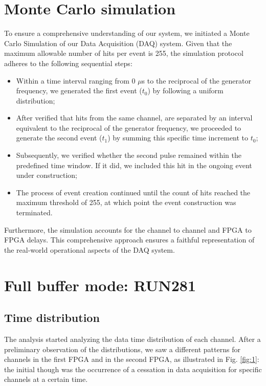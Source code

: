 \documentclass[12pt]{article}
\begin{document}
\section{Monte Carlo simulation}\label{MonteCarlo}
To ensure a comprehensive understanding of our system, we initiated a Monte Carlo Simulation of our Data Acquisition (DAQ) system. 
Given that the maximum allowable number of hits per event is 255, the simulation protocol adheres to the following sequential steps:
\begin{itemize}
  \item Within a time interval ranging from 0 $\mu$s to the reciprocal of the generator frequency, we generated the first event ($t_0$) by following a uniform distribution;
    \item After verified that hits from the same channel, are separated by an interval equivalent to the reciprocal of the generator frequency, we proceeded to 
      generate the second event ($t_1$) by summing this specific time increment to $t_0$;
      \item Subsequently, we verified whether the second pulse remained within the predefined time window. If it did, we included this hit in the ongoing event under construction;
      \item The process of event creation continued until the count of hits reached the maximum threshold of 255, at which point the event construction was terminated.
\end{itemize}
Furthermore, the simulation accounts for the channel to channel and FPGA to FPGA delays. 
This comprehensive approach ensures a faithful representation of the real-world operational aspects of the DAQ system.

\section{Full buffer mode: RUN281}
\subsection{Time distribution}
The analysis started analyzing the data time distribution of each channel.
After a preliminary observation of the distributions, we saw a different patterns for channels in the first FPGA and in the second FPGA,
as illustrated in Fig. \ref{fig:1}: the initial though  was the occurrence of a cessation in data acquisition for specific channels at a certain time.
\end{document}
